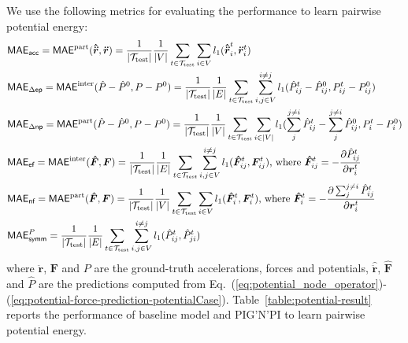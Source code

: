 \documentclass{article}
\newcommand{\pignpi}{PIG'N'PI\xspace}
\begin{document}
We use the following metrics for evaluating the performance to learn pairwise potential energy:
\begin{align}
&\textsf{MAE\textsubscript{acc}}= \textsf{MAE}^{\mathrm{part}}(\bm{\hat{\ddot{r}}},\bm{\ddot{r}}) =  \frac{1}{|\mathcal{T}_{\text{test}}|} \frac{1}{|V|}  \sum_{t\in \mathcal{T}_{\text{test}}}\sum_{i\in V} l_1(\bm{\hat{\ddot{r}}}_{i}^t, \bm{\ddot{r}}_{i}^t)
 \\
&\textsf{MAE\textsubscript{$\Delta$ep}} = \textsf{MAE}^\mathrm{inter} (\hat{P}-\hat{P}^0, P-P^0) = \frac{1}{|\mathcal{T}_{\text{test}}|} \frac{1}{|E|} \sum_{t \in \mathcal{T}_{\text{test}}} \sum_{i,j\in V}^{i \neq j} l_1(\hat{P}_{ij}^t - \hat{P}_{ij}^0, P_{ij}^t - P_{ij}^0)\\
&\textsf{MAE\textsubscript{$\Delta$np}} = \textsf{MAE}^\mathrm{part} (\hat{P} - \hat{P}^0, P - P^0) =\frac{1}{|\mathcal{T}_{\text{test}}|} \frac{1}{|V|} \sum_{t \in \mathcal{T}_{\text{test}}} \sum_{i \in |V|} l_1(\sum_{j}^{j\neq i}\hat{P}_{ij}^t - \sum_{j}^{j\neq i}\hat{P}_{ij}^0, P_{i}^t - P_{i}^0 )\\
&\textsf{MAE\textsubscript{ef}} = \textsf{MAE}^{\mathrm{inter}}(\bm{\hat{F}},\bm{F}) = \frac{1}{|\mathcal{T}_{\text{test}}|} \frac{1}{|E|}  \sum_{t\in \mathcal{T}_{\text{test}}}\sum_{i,j \in V}^{i\neq j} l_1(\bm{\hat{F}}_{ij}^t, \bm{F}_{ij}^t) \text{, where } \bm{\hat{F}}_{ij}^t = -\frac{\partial \hat{P}_{ij}^t}{\partial \bm{r}_{i}^t}\\
&\textsf{MAE\textsubscript{nf}}= \textsf{MAE}^{\mathrm{part}}(\bm{\hat{F}}, \bm{F}) = \frac{1}{|\mathcal{T}_{\text{test}}|} \frac{1}{|V|}  \sum_{t\in \mathcal{T}_{\text{test}}}\sum_{i\in V} l_1(\bm{\hat{F}}_{i}^t, \bm{F}_{i}^t) \text{, where } \bm{\hat{F}}_{i}^t=-\frac{\partial \sum_j^{j\neq i}\hat{P}_{ij}^t}{\partial \bm{r}_{i}^t}\\
&\textsf{MAE}_\textsf{symm}^{P}= \frac{1}{|\mathcal{T}_{\text{test}}|} \frac{1}{|E|}  \sum_{t\in \mathcal{T}_{\text{test}}}\sum_{i,j\in V}^{i\neq j} l_1(\hat{P}_{ij}^t, \hat{P}_{ji}^t)
\end{align}
where $\bm{\ddot{r}}$, $\bm{F}$ and $P$ are the ground-truth accelerations, forces and potentials, $\bm{\hat{\ddot{r}}}$, $\bm{\hat{F}}$ and $\hat{P}$ are the predictions computed from Eq.~(\ref{eq:potential_node_operator})-(\ref{eq:potential-force-prediction-potentialCase}). 
Table~\ref{table:potential-result} reports the  performance of baseline model and \pignpi to learn pairwise potential energy. 
\end{document}

